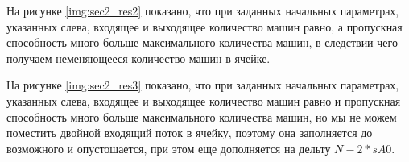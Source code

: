На рисунке \ref{img:sec2_res2} показано, что при заданных начальных параметрах, указанных слева, входящее и выходящее количество машин равно, а пропускная способность много больше максимального количества машин, в следствии чего получаем неменяющееся количество машин в ячейке.


На рисунке \ref{img:sec2_res3} показано, что при заданных начальных параметрах, указанных слева, входящее и выходящее количество машин равно и пропускная способность много больше максимального количества машин, но мы не можем поместить двойной входящий поток в ячейку, поэтому она заполняется до возможного и опустошается, при этом еще дополняется на дельту $N - 2 * s A 0$.


\clearpage